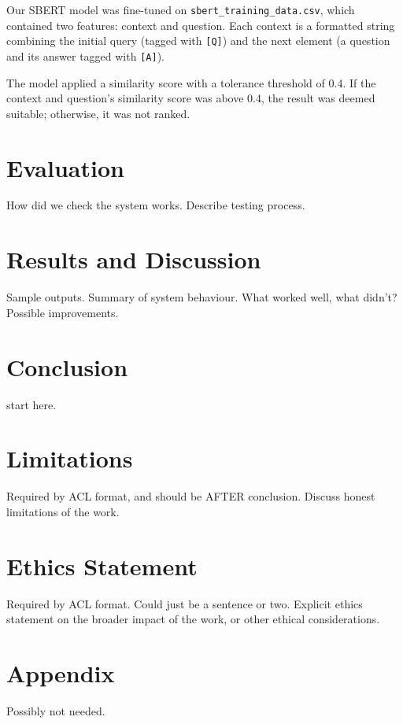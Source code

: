 \documentclass[11pt]{article}
\begin{document}
Our SBERT model was fine-tuned on \texttt{sbert\_training\_data.csv}, which contained two features: context and question. Each context is a formatted string combining the initial query (tagged with \texttt{[Q]}) and the next element (a question and its answer tagged with \texttt{[A]}).
 \newline
 \newline

The model applied a similarity score with a tolerance threshold of 0.4. If the context and question's similarity score was above 0.4, the result was deemed suitable; otherwise, it was not ranked.


\cite{Aliannejadi2019}

\section{Evaluation}
How did we check the system works.
Describe testing process.

\section{Results and Discussion}
Sample outputs.
Summary of system behaviour.
What worked well, what didn't?
Possible improvements.

\section{Conclusion}
start here.

\section*{Limitations}
Required by ACL format, and should be AFTER conclusion.
Discuss honest limitations of the work.

\section*{Ethics Statement}
Required by ACL format. Could just be a sentence or two.
Explicit ethics statement on the broader impact of the work, or other ethical considerations.




\appendix

\section{Appendix}
Possibly not needed.
\end{document}
